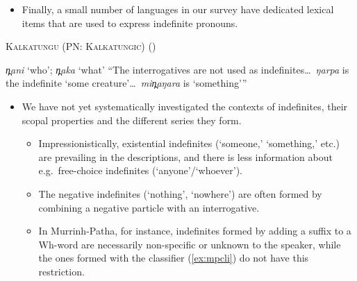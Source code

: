 \documentclass{article}
\begin{document}
\begin{itemize}
    \item Finally, a small number of languages in our survey have dedicated lexical items that are used to express indefinite pronouns.
\end{itemize}

\begin{exe}
  \ex \textsc{Kalkatungu (PN: Kalkatungic)} (\citealt[104--5]{blake79})
  \begin{xlist}
    \ex \textit{\charis n̪ani} `who'; \textit{\charis n̪aka} `what'
    \ex ``The interrogatives are not used as indefinites\ldots\ \textit{\charis ŋarpa} is the indefinite `some creature'\ldots\ \textit{\charis min̪aŋara} is `something'\thinspace''
  \end{xlist}
\end{exe}

\begin{itemize}
\item We have not yet systematically investigated the contexts of indefinites, their scopal properties and the different series they form.
  \begin{itemize}
  \item Impressionistically, existential indefinites (`someone,' `something,' etc.) are prevailing in the descriptions, and there is less information about e.g.\ free-choice indefinites (`anyone'/`whoever').
  \item The negative indefinites (`nothing', `nowhere') are often formed by combining a negative particle with an interrogative.%
  \item In Murrinh-Patha, for instance, indefinites formed by adding a suffix to a Wh-word are necessarily non-specific or unknown to the speaker, while the ones formed with the classifier (\ref{ex:mpcli}) do not have this restriction.
  \end{itemize}
  \end{itemize}
\end{document}
